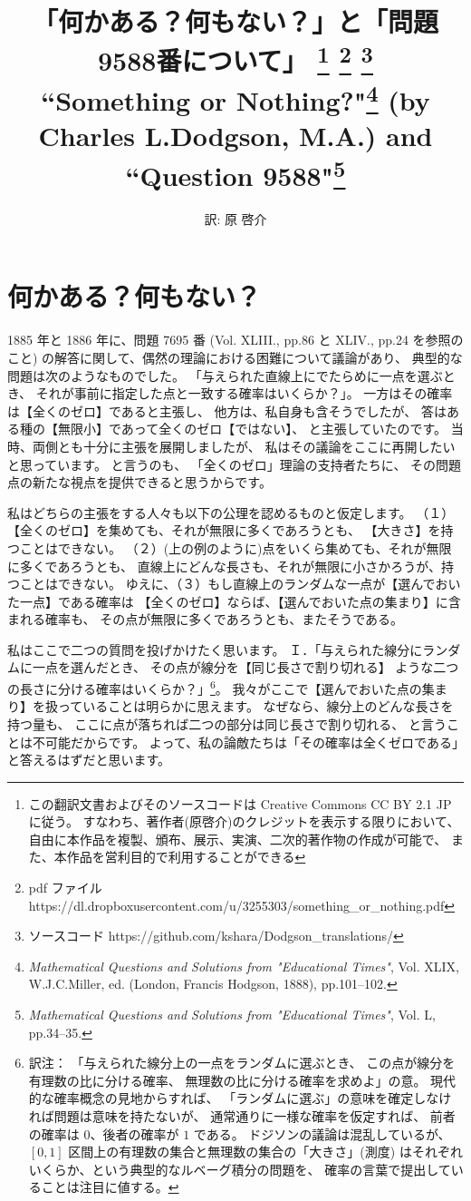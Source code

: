 \documentclass{article}
\title{「何かある？何もない？」と「問題9588番について」
    \footnote{この翻訳文書およびそのソースコードは
    Creative Commons CC BY 2.1 JP に従う。
    すなわち、著作者(原啓介)のクレジットを表示する限りにおいて、
    自由に本作品を複製、頒布、展示、実演、二次的著作物の作成が可能で、
    また、本作品を営利目的で利用することができる}
    \footnote{pdf ファイル https://dl.dropboxusercontent.com/u/3255303/something\_or\_nothing.pdf}
    \footnote{ソースコード https://github.com/kshara/Dodgson\_translations/}
    \\
    \smallskip
    {\large
        ``Something or Nothing?"\footnote{
            {\it Mathematical Questions and Solutions from "Educational Times"},
            Vol. XLIX,
    W.J.C.Miller, ed. (London, Francis Hodgson, 1888), pp.101--102.}
    (by Charles L.Dodgson, M.A.)
    and ``Question 9588"\footnote{
        {\it Mathematical Questions and Solutions from "Educational Times"},
    Vol. L, pp.34--35.}
    }
}
\author{訳: 原 啓介}
\begin{document}
\maketitle

\section*{何かある？何もない？}

  1885 年と 1886 年に、問題 7695 番
(Vol. XLIII., pp.86 と XLIV., pp.24 を参照のこと)
の解答に関して、偶然の理論における困難について議論があり、
典型的な問題は次のようなものでした。
「与えられた直線上にでたらめに一点を選ぶとき、
それが事前に指定した点と一致する確率はいくらか？」。
一方はその確率は【全くのゼロ】であると主張し、
他方は、私自身も含そうでしたが、
答はある種の【無限小】であって全くのゼロ【ではない】、
と主張していたのです。
当時、両側とも十分に主張を展開しましたが、
私はその議論をここに再開したいと思っています。
と言うのも、
「全くのゼロ」理論の支持者たちに、
その問題点の新たな視点を提供できると思うからです。

 私はどちらの主張をする人々も以下の公理を認めるものと仮定します。
（１）【全くのゼロ】を集めても、それが無限に多くであろうとも、
【大きさ】を持つことはできない。
（２）(上の例のように)点をいくら集めても、それが無限に多くであろうとも、
直線上にどんな長さも、それが無限に小さかろうが、持つことはできない。
ゆえに、（３）もし直線上のランダムな一点が【選んでおいた一点】である確率は
【全くのゼロ】ならば、【選んでおいた点の集まり】に含まれる確率も、
その点が無限に多くであろうとも、またそうである。

 私はここで二つの質問を投げかけたく思います。
Ｉ．「与えられた線分にランダムに一点を選んだとき、
その点が線分を【同じ長さで割り切れる】
ような二つの長さに分ける確率はいくらか？」\footnote{訳注：
「与えられた線分上の一点をランダムに選ぶとき、
この点が線分を有理数の比に分ける確率、
無理数の比に分ける確率を求めよ」の意。
現代的な確率概念の見地からすれば、
「ランダムに選ぶ」の意味を確定しなければ問題は意味を持たないが、
通常通りに一様な確率を仮定すれば、
前者の確率は $0$、後者の確率が $1$ である。
ドジソンの議論は混乱しているが、
$[0, 1]$ 区間上の有理数の集合と無理数の集合の「大きさ」(測度)
はそれぞれいくらか、という典型的なルベーグ積分の問題を、
確率の言葉で提出していることは注目に値する。}。
我々がここで【選んでおいた点の集まり】を扱っていることは明らかに思えます。
なぜなら、線分上のどんな長さを持つ量も、
ここに点が落ちれば二つの部分は同じ長さで割り切れる、
と言うことは不可能だからです。
よって、私の論敵たちは「その確率は全くゼロである」と答えるはずだと思います。
\end{document}
